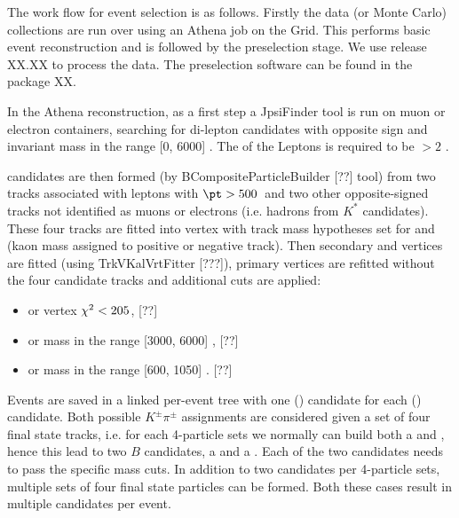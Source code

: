 The work flow for event selection is as follows.
Firstly the data (or Monte Carlo) collections are run over using an Athena job on the Grid.
This performs basic event reconstruction and is followed by the preselection stage.
We use release XX.XX to process the data.
The preselection software can be found in the package XX.

In the Athena reconstruction, as a first step a JpsiFinder tool is run on muon or electron
containers, searching for di-lepton candidates with opposite sign and invariant mass
in the range [0, 6000] \mev. The \pt of the Leptons is required to be $> 2$ \gev.

\Bd candidates are then formed (by BCompositeParticleBuilder [??] tool) from two tracks associated
with leptons with $\pt > 500$~\mev and two other opposite-signed tracks not identified as muons
or electrons (i.e. hadrons from $K^*$ candidates). These four tracks are fitted into \Bd vertex
with track mass hypotheses set for \Bd and \Bdb (kaon mass assigned to positive or negative track).
Then secondary \Bd and \kstar vertices are fitted (using TrkVKalVrtFitter [???]), primary vertices
are refitted without the four candidate tracks and additional cuts are applied: 
\begin{itemize}
\setlength{\itemsep}{0pt}%
\setlength{\parskip}{0pt}%
 \item \Bd or \Bdb vertex $\chi^2 < 205$, [??]
 \item \Bd or \Bdb mass in the range [3000, 6000] \mev, [??]
 \item \kstar or \akstar mass in the range [600, 1050] \mev. [??]
\end{itemize}

Events are saved in a linked per-event tree with one \kstar (\akstar) candidate for each \Bd (\Bdb) candidate.
Both possible $K^\pm\pi^\pm$ assignments are considered given a set of four final state tracks, i.e. for each
4-particle sets we normally can build both a \kstar and \akstar, hence this lead to two $B$ candidates, a \Bd
and a \Bdb. Each of the two candidates needs to pass the specific mass cuts.
In addition to two candidates per 4-particle sets, multiple sets of four final state particles can be formed.
Both these cases result in multiple candidates per event.

